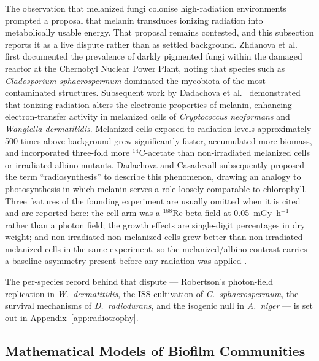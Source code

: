 \documentclass[11pt]{article}
\begin{document}
The observation that melanized fungi colonise high-radiation environments prompted a proposal that
melanin transduces ionizing radiation into metabolically usable energy. That proposal remains
contested, and this subsection reports it as a live dispute rather than as settled background.
Zhdanova et al.\ \cite{zhdanova2000}
first documented the prevalence of darkly pigmented fungi within the damaged reactor at the
Chernobyl Nuclear Power Plant, noting that species such as \textit{Cladosporium sphaerospermum}
dominated the mycobiota of the most contaminated structures. Subsequent work by Dadachova et
al.\ \cite{dadachova2007} demonstrated that ionizing radiation alters the electronic properties of
melanin, enhancing electron-transfer activity in melanized cells of \textit{Cryptococcus neoformans}
and \textit{Wangiella dermatitidis}. Melanized cells exposed to radiation levels approximately 500
times above background grew significantly faster, accumulated more biomass, and incorporated
three-fold more ${}^{14}$C-acetate than non-irradiated melanized cells or irradiated albino
mutants. Dadachova and Casadevall \cite{dadachova2008} subsequently proposed the term
``radiosynthesis'' to describe this phenomenon, drawing an analogy to photosynthesis in which
melanin serves a role loosely comparable to chlorophyll. Three features of the founding experiment
are usually omitted when it is cited and are reported here: the cell arm was a $^{188}$Re beta
field at 0.05~mGy~h$^{-1}$ rather than a photon field; the growth effects are single-digit
percentages in dry weight; and non-irradiated non-melanized cells grew better than non-irradiated
melanized cells in the same experiment, so the melanized/albino contrast carries a baseline
asymmetry present before any radiation was applied \cite{audit2026}.


The per-species record behind that dispute --- Robertson's photon-field replication in
\textit{W.\ dermatitidis}, the ISS cultivation of \textit{C.\ sphaerospermum}, the survival
mechanisms of \textit{D.\ radiodurans}, and the isogenic null in \textit{A.\ niger} --- is set
out in Appendix~\ref{app:radiotrophy}.

\subsection{Mathematical Models of Biofilm Communities}
\end{document}
